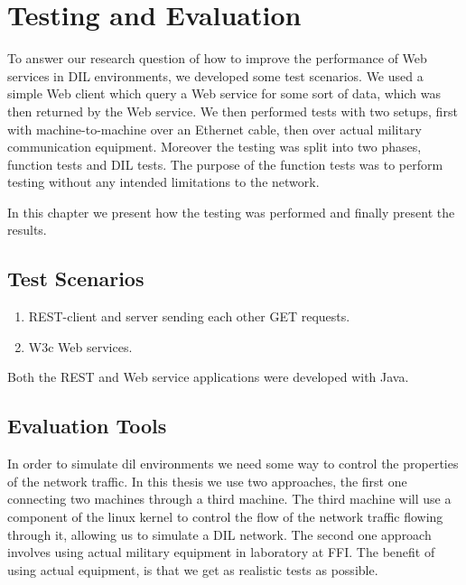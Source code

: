 \chapter{Testing and Evaluation}

To answer our research question of how to improve the performance of Web
services in DIL environments, we developed some test scenarios. We used a simple
Web client which query a Web service for some sort of data, which was then
returned by the Web service. We then performed tests with two setups, first with
machine-to-machine over an Ethernet cable, then over actual military
communication equipment. Moreover the testing was split into two phases,
function tests and DIL tests. The purpose of the function tests was to perform
testing without any intended limitations to the network.

In this chapter we present how the testing was performed and finally present the
results.

\section{Test Scenarios}
\begin{enumerate}
    \item REST-client and server sending each other GET requests.
    \item W3c Web services.
\end{enumerate}

Both the REST and Web service applications were developed with Java.

\section{Evaluation Tools}

In order to simulate \gls{dil} environments we need some way to control the
properties of the network traffic. In this thesis we use two approaches, the
first one connecting two machines through a third machine. The third machine
will use a component of the linux kernel to control the flow of the network
traffic flowing through it, allowing us to simulate a DIL network. The second
one approach involves using actual military equipment in laboratory at FFI. The
benefit of using actual equipment, is that we get as realistic tests as
possible.

\subsection{}

